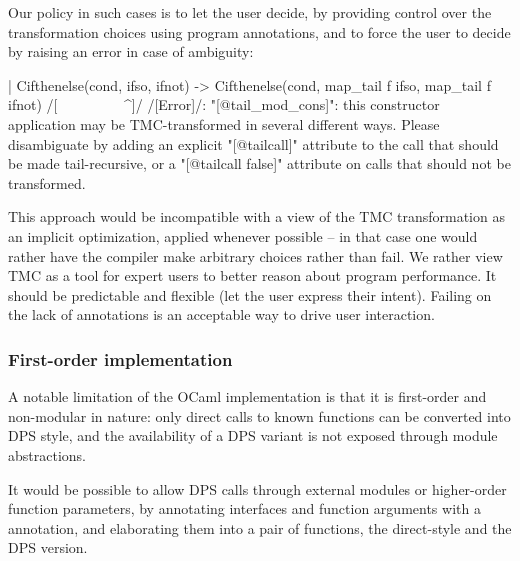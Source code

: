 Our policy in such cases is to let the user decide, by providing
control over the transformation choices using \ocaml{[@tailcall]}
program annotations, and to force the user to decide by raising an
error in case of ambiguity:
\begin{Ocaml}
  | Cifthenelse(cond, ifso, ifnot) ->
      Cifthenelse(cond, map_tail f ifso, map_tail f ifnot)
      /[^^^^^^^^^^^^^^^^^^^^^^^^^^^^^^^^^^^^^^^^^^^^^^^^^^^^]/
/[Error]/: "[@tail_mod_cons]": this constructor application may be TMC-transformed
       in several different ways. Please disambiguate by adding an explicit
       "[@tailcall]" attribute to the call that should be made tail-recursive,
       or a "[@tailcall false]" attribute on calls that should not be
       transformed.
\end{Ocaml}

This approach would be incompatible with a view of the TMC
transformation as an implicit optimization, applied whenever
possible -- in that case one would rather have the compiler make
arbitrary choices rather than fail. We rather view TMC as a tool for
expert users to better reason about program performance. It should be
predictable and flexible (let the user express
their intent). Failing on the lack of annotations is an acceptable way
to drive user interaction.

\subsubsection{First-order implementation} A notable limitation of the
OCaml implementation is that it is first-order and non-modular in
nature: only direct calls to known functions can be converted into DPS
style, and the availability of a DPS variant is not exposed through
module abstractions.

It would be possible to allow DPS calls through external modules or
higher-order function parameters, by annotating interfaces and
function arguments with a  annotation, and
elaborating them into a pair of functions, the direct-style and the DPS
version.

